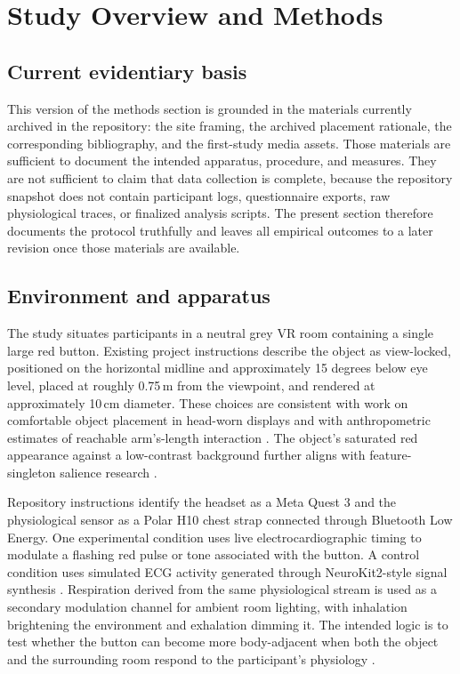 \section{Study Overview and Methods}

\subsection{Current evidentiary basis}

This version of the methods section is grounded in the materials currently archived in the repository: the site framing, the archived placement rationale, the corresponding bibliography, and the first-study media assets. Those materials are sufficient to document the intended apparatus, procedure, and measures. They are not sufficient to claim that data collection is complete, because the repository snapshot does not contain participant logs, questionnaire exports, raw physiological traces, or finalized analysis scripts. The present section therefore documents the protocol truthfully and leaves all empirical outcomes to a later revision once those materials are available.

\subsection{Environment and apparatus}

The study situates participants in a neutral grey VR room containing a single large red button. Existing project instructions describe the object as view-locked, positioned on the horizontal midline and approximately 15 degrees below eye level, placed at roughly 0.75\,m from the viewpoint, and rendered at approximately 10\,cm diameter. These choices are consistent with work on comfortable object placement in head-worn displays and with anthropometric estimates of reachable arm's-length interaction \citep{Lin2021,Mirbagheri2024,Bonin2022,Alghofaili2019,McNamara2019}. The object's saturated red appearance against a low-contrast background further aligns with feature-singleton salience research \citep{Li2008,CastellottiEtAl2022}.

Repository instructions identify the headset as a Meta Quest 3 and the physiological sensor as a Polar H10 chest strap connected through Bluetooth Low Energy. One experimental condition uses live electrocardiographic timing to modulate a flashing red pulse or tone associated with the button. A control condition uses simulated ECG activity generated through NeuroKit2-style signal synthesis \citep{MakowskiEtAl2021}. Respiration derived from the same physiological stream is used as a secondary modulation channel for ambient room lighting, with inhalation brightening the environment and exhalation dimming it. The intended logic is to test whether the button can become more body-adjacent when both the object and the surrounding room respond to the participant's physiology \citep{RockstrohEtAl2019,LueddeckeFelnhofer2022,ChittaroEtAl2024}.

